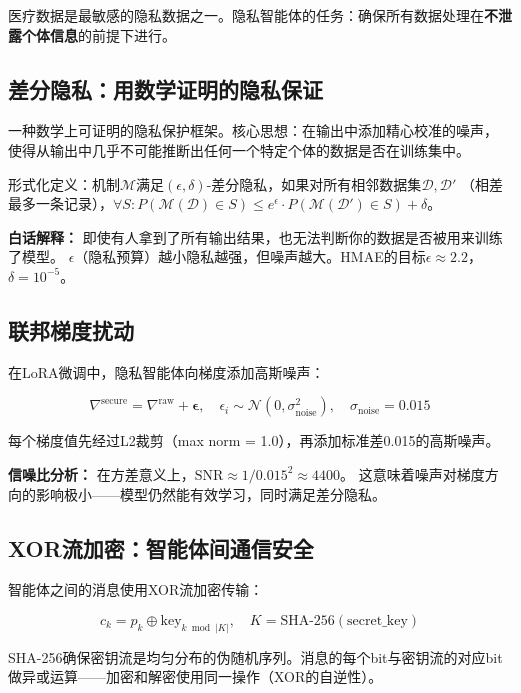 \documentclass[11pt,a4paper]{ctexart}
\begin{document}
医疗数据是最敏感的隐私数据之一。隐私智能体的任务：确保所有数据处理在\textbf{不泄露个体信息}的前提下进行。

\subsection{差分隐私：用数学证明的隐私保证}

\begin{defbox}
一种数学上可证明的隐私保护框架。核心思想：在输出中添加精心校准的噪声，
使得从输出中几乎不可能推断出任何一个特定个体的数据是否在训练集中。

形式化定义：机制$\mathcal{M}$满足$(\epsilon, \delta)$-差分隐私，如果对所有相邻数据集$\mathcal{D}, \mathcal{D}'$
（相差最多一条记录），$\forall S: P(\mathcal{M}(\mathcal{D}) \in S) \leq e^{\epsilon} \cdot P(\mathcal{M}(\mathcal{D}') \in S) + \delta$。
\end{defbox}

\textbf{白话解释：} 即使有人拿到了所有输出结果，也无法判断你的数据是否被用来训练了模型。
$\epsilon$（隐私预算）越小隐私越强，但噪声越大。HMAE的目标$\epsilon \approx 2.2$，$\delta = 10^{-5}$。

\subsection{联邦梯度扰动}

在LoRA微调中，隐私智能体向梯度添加高斯噪声：

$$\nabla^{\text{secure}} = \nabla^{\text{raw}} + \boldsymbol{\epsilon}, \quad \epsilon_i \sim \mathcal{N}(0, \sigma_{\text{noise}}^2), \quad \sigma_{\text{noise}} = 0.015$$

每个梯度值先经过L2裁剪（max norm = 1.0），再添加标准差0.015的高斯噪声。

\textbf{信噪比分析：} 在方差意义上，$\text{SNR} \approx 1/0.015^2 \approx 4400$。
这意味着噪声对梯度方向的影响极小——模型仍然能有效学习，同时满足差分隐私。

\subsection{XOR流加密：智能体间通信安全}

智能体之间的消息使用XOR流加密传输：

$$c_k = p_k \oplus \text{key}_{k \bmod |K|}, \quad K = \text{SHA-256}(\text{secret\_key})$$

SHA-256确保密钥流是均匀分布的伪随机序列。消息的每个bit与密钥流的对应bit做异或运算——加密和解密使用同一操作（XOR的自逆性）。
\end{document}
